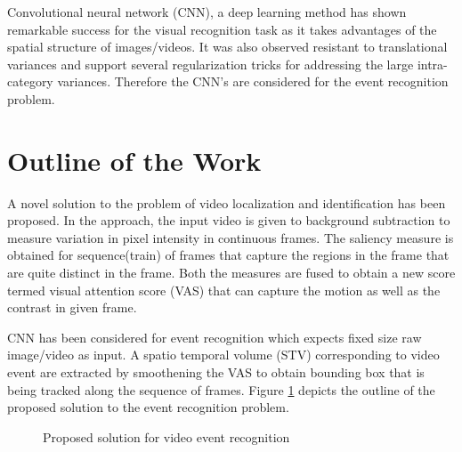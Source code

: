 \par Convolutional neural network (CNN), a deep learning method has shown remarkable success for the visual recognition task as it takes advantages of the spatial structure of images/videos.  It was also observed resistant to translational variances and support several regularization tricks for addressing the large intra-category variances.  Therefore the CNN's are considered for  the event recognition problem.
\clearpage

\section{Outline of the Work}
A novel solution to the problem of video localization and identification has been proposed. In the approach, the input video is given to background subtraction to measure variation in pixel intensity in continuous frames.  The saliency measure is obtained for sequence(train) of frames that capture the regions in the frame that are quite distinct in the frame.  Both the measures are fused to obtain a new score termed visual attention score (VAS) that can capture the motion as well as the contrast in given frame. 
\par CNN has been considered for event recognition which expects fixed size raw image/video as input. A spatio temporal volume (STV) corresponding to video event are extracted by smoothening the VAS to obtain bounding box that is being tracked along the sequence of frames.  Figure \ref{fig:outline}  depicts the outline of the proposed solution to the event recognition problem.
\begin{figure}[htpb]
   \begin{center}
	   	{%
			\setlength{\fboxsep}{5pt}%
	    }%
     \caption {Proposed solution for video event recognition}
   \label{fig:outline}
   \end{center}
 \end{figure}
